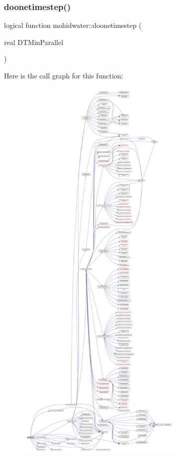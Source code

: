 \subsubsection{\texorpdfstring{doonetimestep()}{doonetimestep()}}
{\footnotesize\ttfamily logical function mohidwater\+::doonetimestep (\begin{DoxyParamCaption}\item[{real}]{D\+T\+Min\+Parallel }\end{DoxyParamCaption})}

Here is the call graph for this function\+:\nopagebreak
\begin{figure}[H]
\begin{center}
\leavevmode
\includegraphics[height=550pt]{_main_8_f90_a5a877f32d8c35a58c7bd824a65b07dba_cgraph}
\end{center}
\end{figure}
